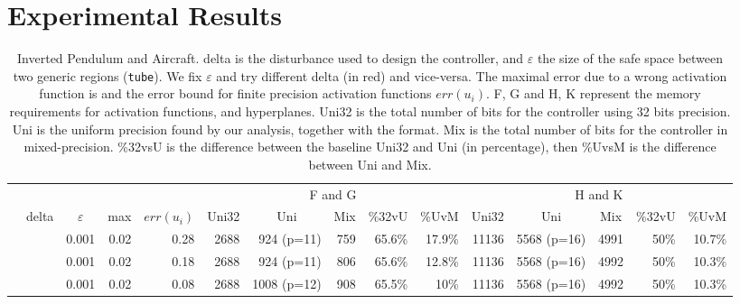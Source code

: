 \section{Experimental Results}
\begin{table*}[ht]
	\centering
	\caption{Inverted Pendulum and Aircraft.\textmd{ delta is the disturbance used to design the controller, and $\varepsilon$ the size of the safe space between two generic regions (\texttt{tube}). We fix $\varepsilon$ and try different delta (in red) and vice-versa. The maximal error due to a wrong activation function is \maxUij and the error bound for finite precision activation functions $err(u_{i})$. F, G and H, K represent the memory requirements for activation functions, and hyperplanes. Uni32 is the total number of bits for the controller using 32 bits precision. Uni is the uniform precision found by our analysis, together with the format. Mix is the total number of bits for the controller in mixed-precision. \%32vsU is the difference between the baseline Uni32 and Uni (in percentage), then \%UvsM is the difference between Uni and Mix.}}
	\label{tab:ipd}
	\begin{tabular}{|l|rrrrrrrrrrrrrr|}
		\cline{6-15}
		\multicolumn{1}{c}{} & %
		\multicolumn{4}{c}{} &
		\multicolumn{5}{|c|}{F and G} &
		\multicolumn{5}{c|}{H and K} \\
		\cline{2-15}
		\multicolumn{1}{c}{\multirow{14}{*}{\rotatebox{90}{pendulum}}} &
		\multicolumn{1}{|c}{delta}&
		\multicolumn{1}{c}{$\varepsilon$} &
		\multicolumn{1}{c}{max} &
		\multicolumn{1}{c}{$err(u_{i})$} &
		\multicolumn{1}{c}{Uni32}&
		\multicolumn{1}{c}{Uni}&
		\multicolumn{1}{c}{Mix}&
		\multicolumn{1}{c}{\%32vU}&
		\multicolumn{1}{c}{\%UvM}&
		\multicolumn{1}{c}{Uni32}&
		\multicolumn{1}{c}{Uni}&
		\multicolumn{1}{c}{Mix}&
		\multicolumn{1}{c}{\%32vU}&
		\multicolumn{1}{c|}{\%UvM} \\
		\cline{1-15}
		& \color{red}{0.30} & 0.001 & 0.02 & 0.28 & 2688 & 924 (p=11) & 759 & 65.6\% & 17.9\% & 11136 & 5568 (p=16) & 4991 & 50\% & 10.7\% \\
		
		& \color{red}{0.20} & 0.001 & 0.02 & 0.18 & 2688 & 924 (p=11) & 806 & 65.6\% & 12.8\% & 11136 & 5568 (p=16)& 4992 & 50\% & 10.3\% \\
		
		& \color{red}{0.10} & 0.001 & 0.02 & 0.08 & 2688 & 1008 (p=12) & 908 & 65.5\% & 10\% & 11136 & 5568 (p=16)& 4992 & 50\% & 10.3\% \\
		

\end{tabular}
\end{table*}
